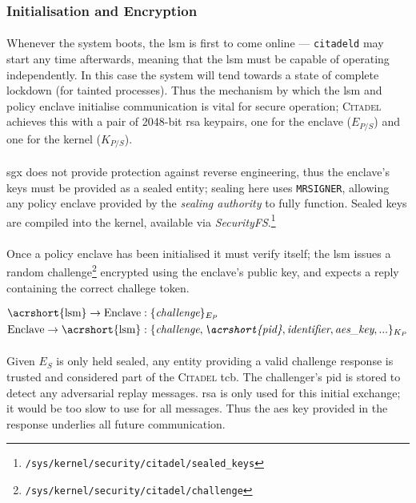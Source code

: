 \subsubsection{Initialisation and Encryption}
\label{sec:initialisation}
\paragraph{} Whenever the system boots, the \acrshort{lsm} is first to come online --- \texttt{citadeld} may start any time afterwards, meaning that the \acrshort{lsm} must be capable of operating independently. In this case the system will tend towards a state of complete lockdown (for tainted processes). Thus the mechanism by which the \acrshort{lsm} and policy enclave initialise communication is vital for secure operation; \textsc{Citadel} achieves this with a pair of 2048-bit \acrshort{rsa} keypairs, one for the enclave ($E_{P/S}$) and one for the kernel ($K_{P/S}$).

\paragraph{} \acrshort{sgx} does not provide protection against reverse engineering, thus the enclave's keys must be provided as a sealed entity; sealing here uses \texttt{MRSIGNER}, allowing any policy enclave provided by the \textit{sealing authority} to fully function. Sealed keys are compiled into the kernel, available via \textit{SecurityFS}.\footnote{\texttt{/sys/kernel/security/citadel/sealed\_keys}}

\paragraph{} Once a policy enclave has been initialised it must verify itself; the \acrshort{lsm} issues a random challenge\footnote{\texttt{/sys/kernel/security/citadel/challenge}} encrypted using the enclave's public key, and expects a reply containing the correct challege token.

\vspace{-5mm}
\begin{align*}
    \text{\acrshort{lsm}} \rightarrow \text{Enclave} &: \{\textit{challenge}\}_{E_{P}} \\
    \text{Enclave} \rightarrow \text{\acrshort{lsm}} &: \{\textit{challenge}, \textit{\acrshort{pid}}, \textit{identifier}, \textit{aes\_key}, ...\}_{K_{P}}
\end{align*}

\paragraph{} Given $E_S$ is only held sealed, any entity providing a valid challenge response is trusted and considered part of the \textsc{Citadel} \acrshort{tcb}. The challenger's \acrshort{pid} is stored to detect any adversarial replay messages. \acrshort{rsa} is only used for this initial exchange; it would be too slow to use for all messages. Thus the \acrshort{aes} key provided in the response underlies all future communication.

